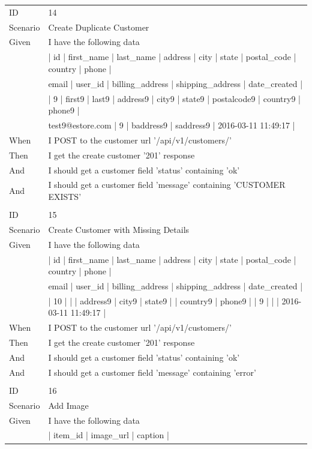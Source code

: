 \documentclass{report}
\begin{document}
\begin{tabular}{ l l }
ID 			& 14 \\
Scenario		& Create Duplicate Customer \\
Given 		& I have the following data \\
    			& | id | first\_name | last\_name | address | city | state | postal\_code | country | phone | \\
    			& email | user\_id | billing\_address | shipping\_address | date\_created | \\
   			& | 9 | first9 | last9 | address9 | city9 | state9 | postalcode9 | country9 | phone9 | \\
   			& test9@estore.com | 9 | baddress9 | saddress9 | 2016-03-11 11:49:17 | \\
When 		& I POST to the customer url '/api/v1/customers/' \\
Then 		& I get the create customer '201' response \\
And 			& I should get a customer field 'status' containing 'ok' \\
And 			& I should get a customer field 'message' containing 'CUSTOMER EXISTS' \\ \\
ID 			& 15 \\
Scenario		& Create Customer with Missing Details \\
Given 		& I have the following data \\
  			& | id | first\_name | last\_name | address | city | state | postal\_code | country | phone | \\
    			& email | user\_id | billing\_address | shipping\_address | date\_created | \\
		    & | 10 |  | | address9 | city9 | state9 | | country9 | phone9 |  | 9 |  |  | 2016-03-11 11:49:17 |\\
When 		& I POST to the customer url '/api/v1/customers/' \\
Then 		& I get the create customer '201' response \\
And 			& I should get a customer field 'status' containing 'ok' \\
And 			& I should get a customer field 'message' containing 'error' \\ \\
ID 			& 16\\
Scenario		& Add Image \\
Given 		& I have the following data \\
      		& | item\_id | image\_url  | caption | \\

\end{tabular}
\end{document}
